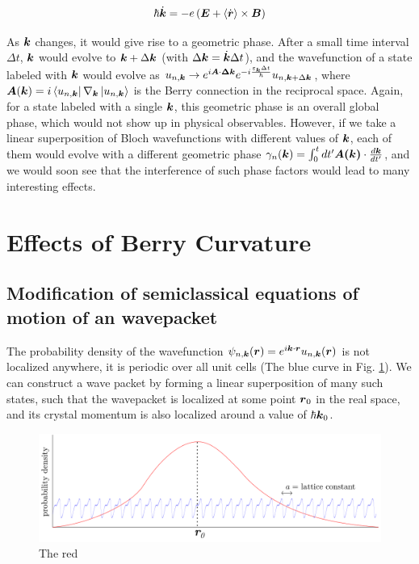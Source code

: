\documentclass[aps,amsmath,prl]{revtex4-2}
\renewcommand\vec[1]{\ensuremath\boldsymbol{#1}} %
\begin{document}
\begin{equation} \label{Eq:evolution-of-k}
	\hbar \dot{\vec{k}} = -e\left(\vec{E} + \langle\dot{\vec{r}}\rangle \times \vec{B} \right)
\end{equation}

As $\vec{k}$ changes, it would give rise to a geometric phase. After a small time interval $\Delta t$, $\vec{k}$ would evolve to $\vec{k} + \Delta \vec{k}$ (with $\Delta \vec{k} = \dot{\vec{k}} \Delta t$), and the wavefunction of a state labeled with $\vec{k}$ would evolve as $u_{n, \vec{k}} \rightarrow e^{i \vec{A}\cdot \vec{\Delta{k}}} e^{-i \frac{\varepsilon_{\vec{k}} \Delta t}{\hbar}} u_{n, \vec{k}+\Delta \vec{k}}$, where $\vec{A}(\vec{k})=i \bra{u_{n,\vec{k}}}\nabla_{\vec{k}} \ket{u_{n,\vec{k}}}$ is the Berry connection in the reciprocal space. Again, for a state labeled with a single $\vec{k}$, this geometric phase is an overall global phase, which would not show up in physical observables. However, if we take a linear superposition of Bloch wavefunctions with different values of $\vec{k}$, each of them would evolve with a different geometric phase $\gamma_n (\vec{k}) = \int_{0}^{t} dt' \vec{A(\vec{k})} \cdot \frac{d \vec{k}}{dt'} $, and we would soon see that the interference of such phase factors would lead to many interesting effects.
\section{Effects of Berry Curvature}
\subsection{Modification of semiclassical equations of motion of an wavepacket}
The probability density of the wavefunction $\psi_{n, \vec{k}} (\vec{r}) = e^{i \vec{k}\cdot \vec{r}} u_{n,\vec{k}} (\vec{r})$ is not localized anywhere, it is periodic over all unit cells (The blue curve in Fig. \ref{fig:wavepacket-and-bloch-wave}). We can construct a wave packet by forming a linear superposition of many such states, such that the wavepacket is localized at some point $\vec{r}_0$ in the real space, and its crystal momentum is also localized around a value of $\hbar \vec{k}_0$.
\begin{figure}
	\centering
	\includegraphics[width=0.7\linewidth]{wavepacket-and-Bloch-wave}
	\caption{The red}
	\label{fig:wavepacket-and-bloch-wave}
\end{figure}
\end{document}
